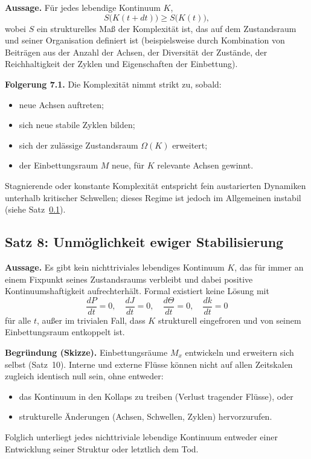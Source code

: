 \textbf{Aussage.}
Für jedes lebendige Kontinuum \(K\),
\[
    S\big(K(t+dt)\big) \ge S\big(K(t)\big),
\]
wobei \(S\) ein strukturelles Maß der Komplexität ist, das auf dem Zustandsraum und seiner Organisation definiert ist (beispielsweise durch Kombination von Beiträgen aus der Anzahl der Achsen, der Diversität der Zustände, der Reichhaltigkeit der Zyklen und Eigenschaften der Einbettung).

\textbf{Folgerung 7.1.}
Die Komplexität nimmt strikt zu, sobald:
\begin{itemize}
    \item neue Achsen auftreten;
    \item sich neue stabile Zyklen bilden;
    \item sich der zulässige Zustandsraum \(\Omega(K)\) erweitert;
    \item der Einbettungsraum \(M\) neue, für \(K\) relevante Achsen gewinnt.
\end{itemize}
Stagnierende oder konstante Komplexität entspricht fein austarierten Dynamiken unterhalb kritischer Schwellen; dieses Regime ist jedoch im Allgemeinen instabil (siehe Satz~\ref{thm:no-eternal-stabilisation}).

\subsection{Satz 8: Unmöglichkeit ewiger Stabilisierung}
\label{thm:no-eternal-stabilisation}

\textbf{Aussage.}
Es gibt kein nichttriviales lebendiges Kontinuum \(K\), das für immer an einem Fixpunkt seines Zustandsraums verbleibt und dabei positive Kontinuumshaftigkeit aufrechterhält.
Formal existiert keine Lösung mit
\[
    \frac{dP}{dt} = 0, \quad \frac{dJ}{dt} = 0, \quad \frac{d\Theta}{dt} = 0, \quad \frac{dk}{dt} = 0
\]
für alle \(t\), außer im trivialen Fall, dass \(K\) strukturell eingefroren und von seinem Einbettungsraum entkoppelt ist.

\textbf{Begründung (Skizze).}
Einbettungsräume \(M_x\) entwickeln und erweitern sich selbst (Satz~10).
Interne und externe Flüsse können nicht auf allen Zeitskalen zugleich identisch null sein, ohne entweder:
\begin{itemize}
    \item das Kontinuum in den Kollaps zu treiben (Verlust tragender Flüsse), oder
    \item strukturelle Änderungen (Achsen, Schwellen, Zyklen) hervorzurufen.
\end{itemize}
Folglich unterliegt jedes nichttriviale lebendige Kontinuum entweder einer Entwicklung seiner Struktur oder letztlich dem Tod.

